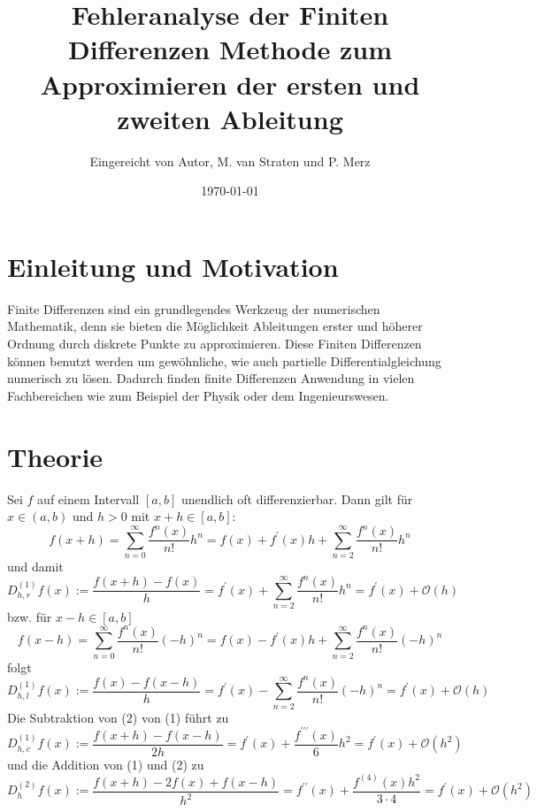 \documentclass{scrartcl}
\title{Fehleranalyse der Finiten Differenzen Methode zum Approximieren der ersten und zweiten Ableitung}
\author{%
  Eingereicht von Autor, M. van Straten und P. Merz
}
\date{\today}
\theoremstyle{remark}
\begin{document}
\maketitle
\tableofcontents
\cleardoublepage


\section{Einleitung und Motivation}
Finite Differenzen sind ein grundlegendes Werkzeug der numerischen Mathematik, denn sie bieten die 
Möglichkeit Ableitungen erster und höherer Ordnung durch diskrete Punkte zu approximieren. 
Diese Finiten Differenzen können benutzt werden um gewöhnliche, wie auch partielle Differentialgleichung 
numerisch zu lösen. Dadurch finden finite Differenzen Anwendung in vielen Fachbereichen wie zum Beispiel der 
Physik oder dem Ingenieurswesen. \cite{FiniteDifferenzen} 




\section{Theorie}
Sei \(f\) auf einem Intervall \([a,b]\) unendlich oft differenzierbar. Dann gilt für \(x \in (a,b)\) und \(h > 0 \) mit \(x + h \in [a,b]\):
\begin{equation}
  f(x + h) = \sum_{n=0}^{\infty}\frac{f^{n}(x)}{n!}h^{n} = f(x) + f^{\prime}(x)h + \sum_{n=2}^{\infty}\frac{f^{n}(x)}{n!}h^{n}
\end{equation}
und damit
\[ D_{h, r}^{(1)}f(x) := \frac{f(x + h) - f(x)}{h} = f^{\prime}(x) + \sum_{n=2}^{\infty}\frac{f^{n}(x)}{n!}h^{n} = f^{\prime}(x) + \mathcal{O}(h)\]
bzw. für \(x - h \in [a,b]\)
\begin{equation}
  f(x - h) = \sum_{n=0}^{\infty}\frac{f^{n}(x)}{n!}(-h)^{n} = f(x) - f^{\prime}(x)h + \sum_{n=2}^{\infty}\frac{f^{n}(x)}{n!}(-h)^{n}
\end{equation}
folgt
\[ D_{h, l}^{(1)}f(x) := \frac{f(x) - f(x - h)}{h} = f^{\prime}(x) - \sum_{n=2}^{\infty}\frac{f^{n}(x)}{n!}(-h)^{n} = f^{\prime}(x) + \mathcal{O}(h)\]
Die Subtraktion von (2) von (1) führt zu
\[ D_{h, c}^{(1)}f(x) := \frac{f(x + h) - f(x - h)}{2h} = f^{\prime}(x) + \frac{f^{\prime\prime\prime}(x)}{6}h^{2} = f^{\prime}(x) + \mathcal{O}(h^{2})\]
und die Addition von (1) und (2) zu
\[ D_{h}^{(2)}f(x) := \frac{f(x + h) -2f(x) + f(x - h)}{h^2} = f^{\prime\prime}(x) + \frac{f^{(4)}(x)h^{2}}{3 \cdot 4} = f^{\prime}(x) + \mathcal{O}(h^{2})\]
\end{document}
